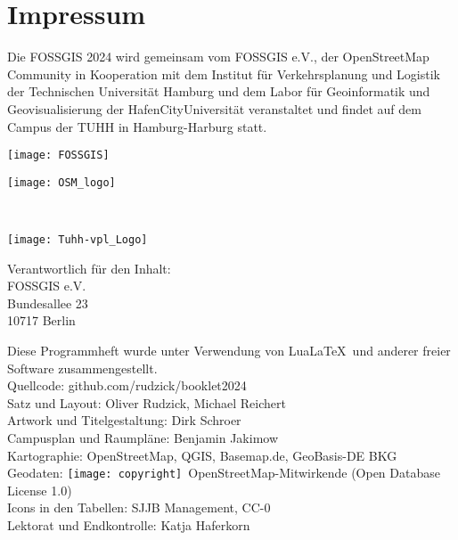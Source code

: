 \newpage
\vspace*{-4.5em}

\section*{Impressum}
\label{impressum}
\pagestyle{cropmarksstyle}

\RaggedRight
{\small
Die FOSSGIS 2024 wird gemeinsam vom FOSSGIS e.V.,  der OpenStreetMap Community
in Kooperation mit dem Institut für Verkehrsplanung und Logistik der Technischen Universität Hamburg
und dem Labor für Geoinformatik und Geovisualisierung der HafenCityUniversität veranstaltet und
findet auf dem Campus der TUHH in Hamburg-Harburg statt.

\vspace{0.5em}
\newlength\logoHeight
\setlength{\logoHeight}{4.0\baselineskip}
\begin{minipage}[c]{0.5\textwidth}
  \texttt{[image: FOSSGIS]}
\end{minipage}
\begin{minipage}[c]{0.45\textwidth}
  \texttt{[image: OSM\_logo]}
\end{minipage}\\
\begin{minipage}[l]{0.45\textwidth}
  \texttt{[image: Tuhh-vpl\_Logo]}
\end{minipage}
\begin{minipage}[r]{0.45\textwidth}
  
\end{minipage}

\vspace{0.5em}
\noindent Verantwortlich für den Inhalt:\\
FOSSGIS e.V.\\
Bundesallee 23\\
10717 Berlin

\vspace{0.5em}
\noindent Diese Programmheft wurde unter Verwendung von Lua\LaTeX\ und 
anderer freier Software zusammengestellt.\\
Quellcode: github.com/rudzick/booklet2024\\
\noindent Satz und Layout: Oliver Rudzick, Michael Reichert\\
Artwork und Titelgestaltung: Dirk Schroer\\
Campusplan und Raumpläne: Benjamin Jakimow\\
Kartographie: OpenStreetMap, QGIS, Basemap.de, GeoBasis-DE BKG\\
Geodaten: \texttt{[image: copyright]}~Open\-Street\-Map-Mitwirkende (Open Database License 1.0)\\
Icons in den Tabellen: SJJB Management, CC-0\\
Lektorat und Endkontrolle: Katja Haferkorn

}
